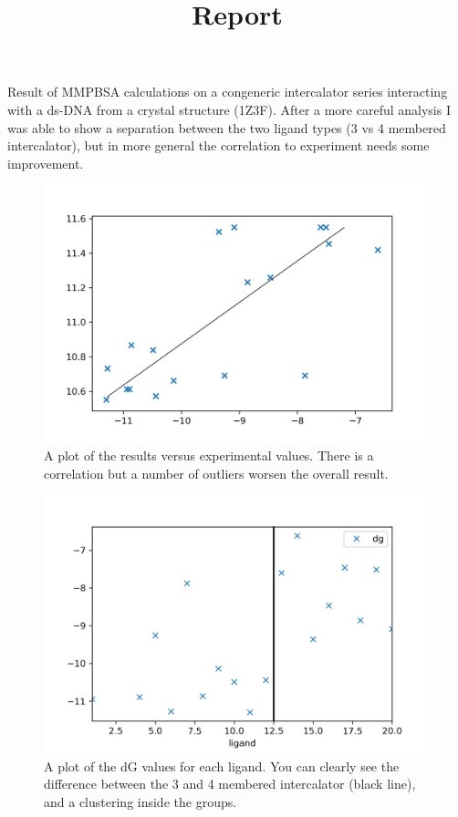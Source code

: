\documentclass{article}
\title{Report}
\begin{document}
\maketitle

Result of MMPBSA calculations on a congeneric intercalator series interacting with a ds-DNA from a crystal structure (1Z3F). After a more careful analysis I was able to show a separation between the two ligand types (3 vs 4 membered intercalator), but in more general the correlation to experiment needs some improvement. 

\begin{figure}
  \includegraphics{res-vs-exp}
  \caption{A plot of the results versus experimental values. There is a correlation but a number of outliers worsen the overall result.}
  \label{fig1}
\end{figure}  

\begin{figure}
  \includegraphics{fig}
  \caption{A plot of the dG values for each ligand. You can clearly see the difference between the 3 and 4 membered intercalator (black line), and a clustering inside the groups.}
  \label{fi2}
\end{figure}
  
\end{document}
